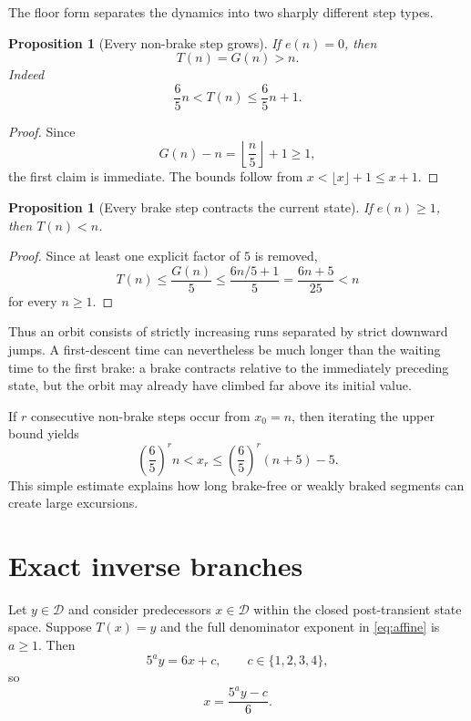 \documentclass[11pt]{article}
\newtheorem{proposition}[theorem]{Proposition}
\theoremstyle{definition}
\newcommand{\D}{\mathcal{D}}
\begin{document}
The floor form separates the dynamics into two sharply different step types.

\begin{proposition}[Every non-brake step grows]
If $e(n)=0$, then
\[
T(n)=G(n)>n.
\]
Indeed
\[
\frac65n<T(n)\le\frac65n+1.
\]
\end{proposition}

\begin{proof}
Since
\[
G(n)-n=\left\lfloor\frac n5\right\rfloor+1\ge1,
\]
the first claim is immediate. The bounds follow from $x<\lfloor x\rfloor+1\le x+1$.
\end{proof}

\begin{proposition}[Every brake step contracts the current state]
If $e(n)\ge1$, then $T(n)<n$.
\end{proposition}

\begin{proof}
Since at least one explicit factor of $5$ is removed,
\[
T(n)\le \frac{G(n)}5\le\frac{6n/5+1}{5}
=\frac{6n+5}{25}<n
\]
for every $n\ge1$.
\end{proof}

Thus an orbit consists of strictly increasing runs separated by strict downward jumps. A first-descent time can nevertheless be much longer than the waiting time to the first brake: a brake contracts relative to the immediately preceding state, but the orbit may already have climbed far above its initial value.

If $r$ consecutive non-brake steps occur from $x_0=n$, then iterating the upper bound yields
\begin{equation}
\left(\frac65\right)^r n < x_r
\le \left(\frac65\right)^r(n+5)-5.
\label{eq:runbound}
\end{equation}
This simple estimate explains how long brake-free or weakly braked segments can create large excursions.

\section{Exact inverse branches}

Let $y\in\D$ and consider predecessors $x\in\D$ within the closed post-transient state space. Suppose $T(x)=y$ and the full denominator exponent in \eqref{eq:affine} is $a\ge1$. Then
\[
5^a y=6x+c,\qquad c\in\{1,2,3,4\},
\]
so
\begin{equation}
x=\frac{5^a y-c}{6}.
\label{eq:inverse}
\end{equation}
\end{document}
